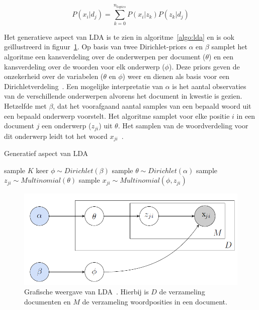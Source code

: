 \begin{equation}
P(x_i | d_j) = \sum\limits_{k=0}^{n_{topics}}P(x_i|z_k)P(z_k|d_j)
\label{formule:lda}
\end{equation}

Het generatieve aspect van LDA is te zien in algoritme~\ref{algo:lda} en is ook ge\"illustreerd in figuur~\ref{fig:lda}. Op basis van twee Dirichlet-priors $\alpha$ en $\beta$ samplet het algoritme een kansverdeling over de onderwerpen per document ($\theta$) en een kansverdeling over de woorden voor elk onderwerp ($\phi$). Deze priors geven de onzekerheid over de variabelen ($\theta$ en $\phi$) weer en dienen als basis voor een Dirichletverdeling~\cite{Huang2005}. Een mogelijke interpretatie van $\alpha$ is het aantal observaties van de verschillende onderwerpen alvorens het document in kwestie is gezien. Hetzelfde met $\beta$, dat het voorafgaand aantal samples van een bepaald woord uit een bepaald onderwerp voorstelt. Het algoritme samplet voor elke positie $i$ in een document $j$ een onderwerp ($z_{ji}$) uit $\theta$. Het samplen van de woordverdeling voor dit onderwerp leidt tot het woord $x_{ji}$~\cite{LDAsien}.

\begin{algorithm}
\caption{Generatief aspect van LDA}
\begin{algorithmic} 
\STATE sample $K$ keer  $\phi \sim Dirichlet(\beta)$
\STATE sample $\theta \sim Dirichlet(\alpha)$
\STATE sample $z_{ji} \sim Multinomial(\theta)$
\STATE sample $x_{ji} \sim Multinomial(\phi,z_{ji})$
\ENDFOR
\ENDFOR
\end{algorithmic}
\label{algo:lda}
\end{algorithm}
                                  
\begin{figure}[tb]
    \centering
    \includegraphics[width=\linewidth]{Images/lda.png}
    \caption[Grafische weergave van LDA]{Grafische weergave van LDA~\cite{LDAsien}. Hierbij is $D$ de verzameling documenten en $M$ de verzameling woordposities in een document.}
    \label{fig:lda}
\end{figure}

